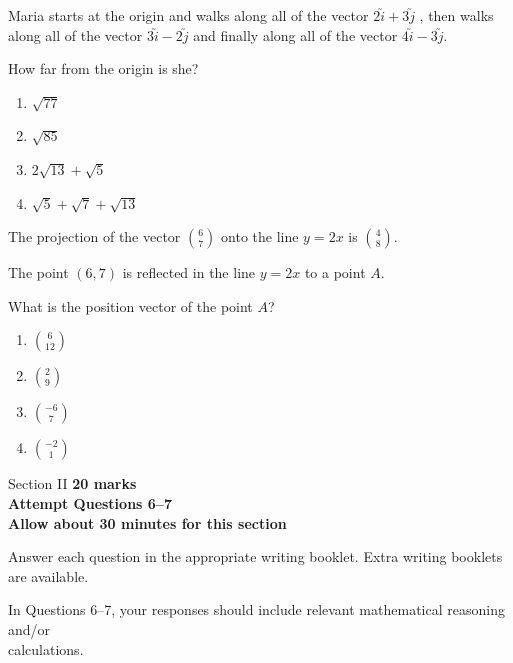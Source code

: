 \documentclass[12pt]{extarticle}    %
\begin{document}
\begin{multiplechoice}
    \pagebreak
    
    \item Maria starts at the origin and walks along all of the vector $2\utilde{i}+3\utilde{j}$ , then walks along all of the vector $3\utilde{i}-2\utilde{j}$ and finally along all of the vector $4\utilde{i}-3\utilde{j}$.

    How far from the origin is she? %
    \begin{enumerate}               %
        \item $\sqrt{77}$           %
        \item $\sqrt{85}$
        \item $2\sqrt{13}+\sqrt{5}$
        \item $\sqrt{5}+\sqrt{7}+\sqrt{13}$
    \end{enumerate}  
    
    \item The projection of the vector $\displaystyle\binom{6}{7}$ onto the line $y=2x$ is $\displaystyle\binom{4}{8}$.
    
    The point $(6,7)$ is reflected in the line $y=2x$ to a point $A$. 
    
    What is the position vector of the point $A$? 
    \begin{enumerate}   
        \item $\displaystyle\binom{6}{12}$ 
        \item $\displaystyle\binom{2}{9}$
        \item $\displaystyle\binom{-6}{7}$
        \item $\displaystyle\binom{-2}{1}$
    \end{enumerate}  
    
\end{multiplechoice}                %

\pagebreak

\begin{sectionheader}{Section II}
    \textbf{20 marks\\
    Attempt Questions 6--7\\
    Allow about 30 minutes for this section}
    
    Answer each question in the appropriate writing booklet. Extra writing booklets are available.
    
    In Questions 6--7, your responses should include relevant mathematical reasoning and/or \\calculations.
\end{sectionheader}
\end{document}
